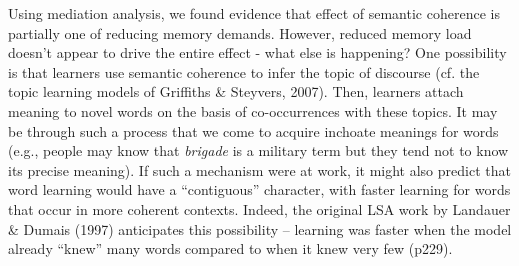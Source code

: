 \documentclass[man,floatsintext]{apa6}
\begin{document}
Using mediation analysis, we found evidence that effect of semantic coherence is partially one of reducing memory demands. However, reduced memory load doesn't appear to drive the entire effect - what else is happening? One possibility is that learners use semantic coherence to infer the topic of discourse (cf. the topic learning models of Griffiths \& Steyvers, 2007). Then, learners attach meaning to novel words on the basis of co-occurrences with these topics. It may be through such a process that we come to acquire inchoate meanings for words (e.g., people may know that \emph{brigade} is a military term but they tend not to know its precise meaning). If such a mechanism were at work, it might also predict that word learning would have a ``contiguous'' character, with faster learning for words that occur in more coherent contexts. Indeed, the original LSA work by Landauer \& Dumais (1997) anticipates this possibility -- learning was faster when the model already ``knew'' many words compared to when it knew very few (p229).


\nocite{*}
\newpage


\end{document}
